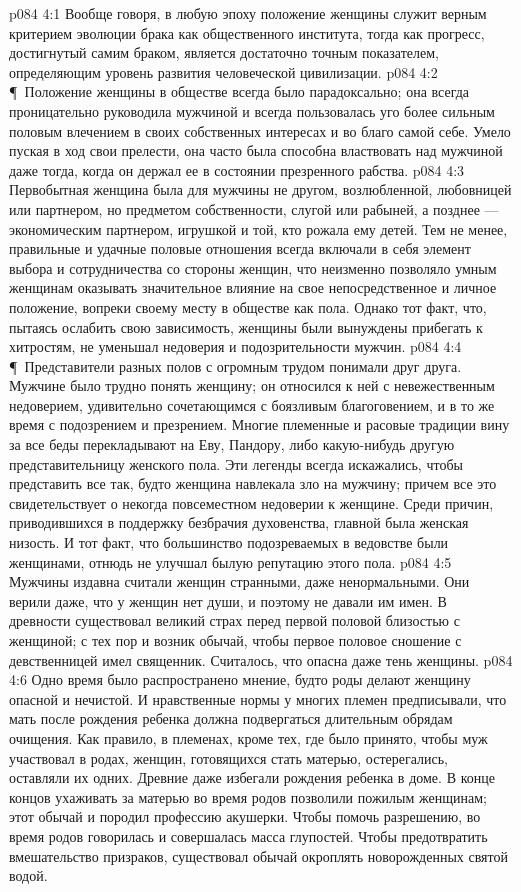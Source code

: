 \vs p084 4:1 Вообще говоря, в любую эпоху положение женщины служит верным критерием эволюции брака как общественного института, тогда как прогресс, достигнутый самим браком, является достаточно точным показателем, определяющим уровень развития человеческой цивилизации.
\vs p084 4:2 \P\ Положение женщины в обществе всегда было парадоксально; она всегда проницательно руководила мужчиной и всегда пользовалась уго более сильным половым влечением в своих собственных интересах и во благо самой себе. Умело пуская в ход свои прелести, она часто была способна властвовать над мужчиной даже тогда, когда он держал ее в состоянии презренного рабства.
\vs p084 4:3 Первобытная женщина была для мужчины не другом, возлюбленной, любовницей или партнером, но предметом собственности, слугой или рабыней, а позднее --- экономическим партнером, игрушкой и той, кто рожала ему детей. Тем не менее, правильные и удачные половые отношения всегда включали в себя элемент выбора и сотрудничества со стороны женщин, что неизменно позволяло умным женщинам оказывать значительное влияние на свое непосредственное и личное положение, вопреки своему месту в обществе как пола. Однако тот факт, что, пытаясь ослабить свою зависимость, женщины были вынуждены прибегать к хитростям, не уменьшал недоверия и подозрительности мужчин.
\vs p084 4:4 \P\ Представители разных полов с огромным трудом понимали друг друга. Мужчине было трудно понять женщину; он относился к ней с невежественным недоверием, удивительно сочетающимся с боязливым благоговением, и в то же время с подозрением и презрением. Многие племенные и расовые традиции вину за все беды перекладывают на Еву, Пандору, либо какую\hyp{}нибудь другую представительницу женского пола. Эти легенды всегда искажались, чтобы представить все так, будто женщина навлекала зло на мужчину; причем все это свидетельствует о некогда повсеместном недоверии к женщине. Среди причин, приводившихся в поддержку безбрачия духовенства, главной была женская низость. И тот факт, что большинство подозреваемых в ведовстве были женщинами, отнюдь не улучшал былую репутацию этого пола.
\vs p084 4:5 Мужчины издавна считали женщин странными, даже ненормальными. Они верили даже, что у женщин нет души, и поэтому не давали им имен. В древности существовал великий страх перед первой половой близостью с женщиной; с тех пор и возник обычай, чтобы первое половое сношение с девственницей имел священник. Считалось, что опасна даже тень женщины.
\vs p084 4:6 Одно время было распространено мнение, будто роды делают женщину опасной и нечистой. И нравственные нормы у многих племен предписывали, что мать после рождения ребенка должна подвергаться длительным обрядам очищения. Как правило, в племенах, кроме тех, где было принято, чтобы муж участвовал в родах, женщин, готовящихся стать матерью, остерегались, оставляли их одних. Древние даже избегали рождения ребенка в доме. В конце концов ухаживать за матерью во время родов позволили пожилым женщинам; этот обычай и породил профессию акушерки. Чтобы помочь разрешению, во время родов говорилась и совершалась масса глупостей. Чтобы предотвратить вмешательство призраков, существовал обычай окроплять новорожденных святой водой.
